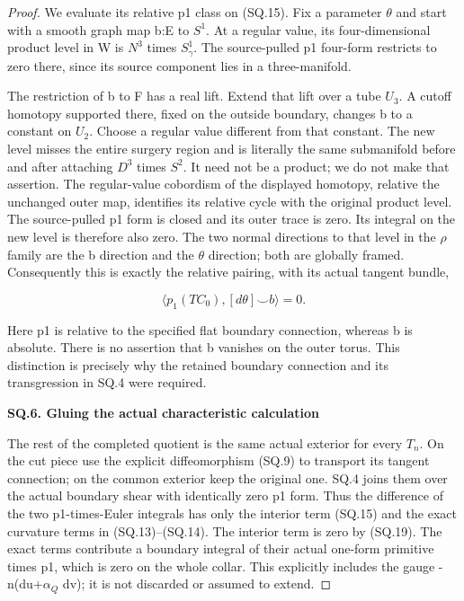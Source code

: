 \begin{proof}
We evaluate its relative p1 class on (SQ.15). Fix a parameter \(\theta\)
and start with a smooth graph map b:E to \(S^{1}\). At a regular value,
its four-dimensional product level in W is \(N^3\) times \(S^1_\gamma\).
The source-pulled p1 four-form restricts to zero there, since its
source component lies in a three-manifold.

The restriction of b to F has a real lift. Extend that lift over a
tube \(U_{3}\). A cutoff homotopy supported there, fixed on the outside
boundary, changes b to a constant on \(U_{2}\). Choose a regular value
different from that constant. The new level misses the entire
surgery region and is literally the same submanifold before and
after attaching \(D^{3}\) times \(S^{2}\). It need not be a product; we do not
make that assertion. The regular-value cobordism of the displayed
homotopy, relative the unchanged outer map, identifies its relative
cycle with the original product level. The source-pulled p1 form is
closed and its outer trace is zero. Its integral on the new level
is therefore also zero. The two normal directions to that level
in the \(\rho\) family are the b direction and the \(\theta\) direction;
both are globally framed. Consequently this is exactly the
relative pairing, with its actual tangent bundle,

\[
              \big\langle p_1(TC_0),[d\theta]\smile b
                         \big\rangle=0.                 \tag{SQ.19}
\]

Here p1 is relative to the specified flat boundary connection,
whereas b is absolute. There is no assertion that b vanishes on
the outer torus. This distinction is precisely why the retained
boundary connection and its transgression in SQ.4 were required.

\par

\medskip\noindent\textbf{SQ.6. Gluing the actual characteristic calculation}

\par\nobreak

The rest of the completed quotient is the same actual exterior for
every \(T_{n}\). On the cut piece use the explicit diffeomorphism (SQ.9)
to transport its tangent connection; on the common exterior keep
the original one. SQ.4 joins them over the actual boundary shear
with identically zero p1 form. Thus the difference of the two
p1-times-Euler integrals has only the interior term (SQ.15) and
the exact curvature terms in (SQ.13)--(SQ.14). The interior term
is zero by (SQ.19). The exact terms contribute a boundary integral
of their actual one-form primitive times p1, which is zero on the
whole collar. This explicitly includes the gauge
-n(du+\(\alpha_{Q}\) dv); it is not discarded or assumed to extend.


\end{proof}
